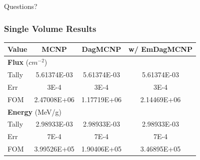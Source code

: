 \documentclass[12pt]{beamer}
\begin{document}
\begin{frame}

\begin{center}
\huge Questions?
\end{center}

\end{frame}


\begin{frame}
\frametitle{Single Volume Results}

\begin{table}[h]

  \begin{center}

    \begin{tabular}{lccc}
     \toprule
      Value & MCNP & DagMCNP & w/ EmDagMCNP \\
     \toprule
     \multicolumn{4}{l}{\textbf{Flux} ($cm^{-2}$)} \\
     \hline
     Tally & 5.61374E-03 & 5.61374E-03 & 5.61374E-03 \\
     Err & 3E-4 & 3E-4 & 3E-4  \\
     FOM & 2.47008E+06 & 1.17719E+06 & 2.14469E+06 \\
     \hline
     \multicolumn{4}{l}{\textbf{Energy} (MeV/g)} \\
     \hline
     Tally & 2.98933E-03 & 2.98933E-03 & 2.98933E-03 \\
     Err & 7E-4 & 7E-4 & 7E-4 \\
     FOM & 3.99526E+05 & 1.90406E+05 & 3.46895E+05 \\
     \bottomrule
     
    \end{tabular}


  \end{center}
\vspace{-0.4cm}
\end{table}

\end{frame}



\begin{frame}
  
  
\end{frame}
\end{document}
